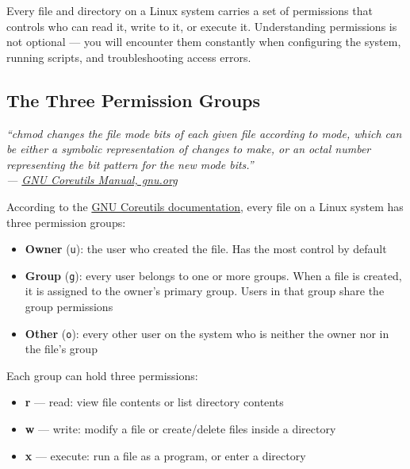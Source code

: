 \documentclass{article}
\newcommand{\code}[1]{\colorbox{codebg}{\texttt{#1}}}
\begin{document}
Every file and directory on a Linux system carries a set of permissions that controls
who can read it, write to it, or execute it. Understanding permissions is not optional
--- you will encounter them constantly when configuring the system, running scripts,
and troubleshooting access errors.

\subsection{The Three Permission Groups}

\begin{mdframed}[linewidth=1.5pt, linecolor=black!50, topline=true, bottomline=true,
	leftline=false, rightline=false, backgroundcolor=black!3]
	\small\itshape
	``chmod changes the file mode bits of each given file according to mode, which can
	be either a symbolic representation of changes to make, or an octal number
	representing the bit pattern for the new mode bits.''\\[4pt]
	\normalfont\small ---
	\href{https://www.gnu.org/software/coreutils/chmod}{GNU Coreutils Manual,
		gnu.org}
\end{mdframed}

\noindent According to the
\href{https://www.gnu.org/software/coreutils/chmod}{GNU Coreutils documentation},
every file on a Linux system has three permission groups:

\begin{itemize}[leftmargin=1.5em, label={\tiny\textbullet}, nosep]
	\item \textbf{Owner} (\code{u}): the user who created the file. Has the most
	control by default
	\item \textbf{Group} (\code{g}): every user belongs to one or more groups.
	When a file is created, it is assigned to the owner's primary group. Users in
	that group share the group permissions
	\item \textbf{Other} (\code{o}): every other user on the system who is neither
	the owner nor in the file's group
\end{itemize}

\noindent Each group can hold three permissions:

\begin{itemize}[leftmargin=1.5em, nosep, label={\tiny\textbullet}]
	\item \textbf{r} --- read: view file contents or list directory contents
	\item \textbf{w} --- write: modify a file or create/delete files inside a directory
	\item \textbf{x} --- execute: run a file as a program, or enter a directory
\end{itemize}
\end{document}
